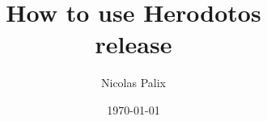 \documentclass[twocolumn]{article}
\begin{document}
\title{
{How to use Herodotos}\\
{release \version}\\
}

\author{Nicolas Palix}

\date{\today}

\maketitle


\end{document}
